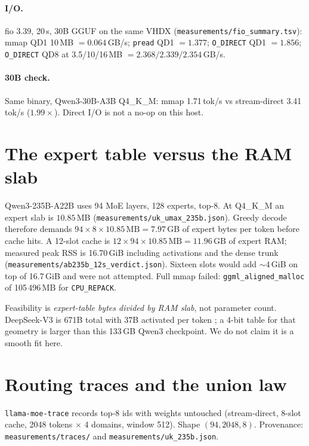\documentclass[11pt]{article}
\newcommand{\tps}{tok/s}
\begin{document}
\paragraph{I/O.}
fio 3.39, 20\,s, 30B GGUF on the same VHDX (\texttt{measurements/fio\_summary.tsv}):
mmap QD1 10\,MB ${=}0.064$\,GB/s; \texttt{pread} QD1 ${=}1.377$;
\texttt{O\_DIRECT} QD1 ${=}1.856$; \texttt{O\_DIRECT} QD8 at 3.5/10/16\,MB
${=}2.368/2.339/2.354$\,GB/s.

\paragraph{30B check.}
Same binary, Qwen3-30B-A3B Q4\_K\_M: mmap 1.71\,\tps{} vs stream-direct
3.41\,\tps{} ($1.99\times$). Direct I/O is not a no-op on this host.

\section{The expert table versus the RAM slab}
\label{sec:slab}

Qwen3-235B-A22B uses 94 MoE layers, 128 experts, top-8. At Q4\_K\_M an expert
slab is $10.85$\,MB (\texttt{measurements/uk\_umax\_235b.json}). Greedy decode therefore
demands $94\times 8\times 10.85\,\mathrm{MB}=7.97$\,GB of expert bytes per token
before cache hits. A 12-slot cache is
$12\times 94\times 10.85\,\mathrm{MB}=11.96$\,GB of expert RAM; measured peak
RSS is 16.70\,GiB including activations and the dense trunk
(\texttt{measurements/ab235b\_12s\_verdict.json}). Sixteen slots would add
$\sim$4\,GiB on top of 16.7\,GiB and were not attempted. Full mmap failed:
\texttt{ggml\_aligned\_malloc} of 105\,496\,MB for \texttt{CPU\_REPACK}.

Feasibility is \emph{expert-table bytes divided by RAM slab}, not parameter
count. DeepSeek-V3 is 671B total with 37B activated per token
\citep{deepseekai2024deepseekv3}; a 4-bit table for that geometry is larger
than this 133\,GB Qwen3 checkpoint. We do not claim it is a smooth fit here.

\section{Routing traces and the union law}
\label{sec:traces}

\texttt{llama-moe-trace} records top-8 ids with weights untouched (stream-direct,
8-slot cache, 2048 tokens $\times$ 4 domains, window 512). Shape $(94,2048,8)$.
Provenance: \texttt{measurements/traces/} and \texttt{measurements/uk\_235b.json}.
\end{document}
